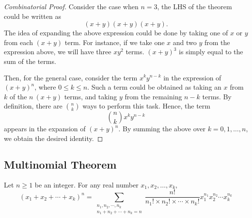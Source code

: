 \begin{proof}[Combinatorial Proof] 
	Consider the case when \(n = 3\), the LHS of the theorem could be written as
	\[
		(x + y)(x + y)(x + y).
	\]
	The idea of expanding the above expression could be done by taking one of \(x\) or \(y\) from each \((x + y)\) term. For instance, if we take one \(x\) and two \(y\) from the expression above, we will have three \(xy^2\) terms. \((x + y)^3\) is simply equal to the sum of the terms. 

	Then, for the general case, consider the term \(x^k y^{n-k}\) in the expression of \((x + y)^n\), where \(0 \leq k \leq n\). Such a term could be obtained as taking an \(x\) from \(k\) of the \(n\ (x + y)\) terms, and taking \(y\) from the remaining \(n - k\) terms. By definition, there are \(\binom{n}{k}\) ways to perform this task. Hence, the term
	\[
		\binom{n}{k}x^k y^{n-k} 
	\]
	appears in the expansion of \((x + y)^n\). By summing the above over \(k = 0, 1, \dots, n\), we obtain the desired identity.
\end{proof}

\subsection{Multinomial Theorem}
\begin{theorem}
	Let \(n \geq 1\) be an integer. For any real number \(x_1, x_2, \dots, x_k\),
	\[
		(x_1 + x_2 + \cdots + x_k)^n = \sum_{\substack{n_1, n_2, \cdots, n_k \\ n_1 + n_2 + \cdots + n_k = n}} \dfrac{n!}{n_1! \times n_2! \times \cdots \times n_k!} x_1^{n_1}x_2^{n_2}\cdots x_k^{n_k}
	\]
\end{theorem}

